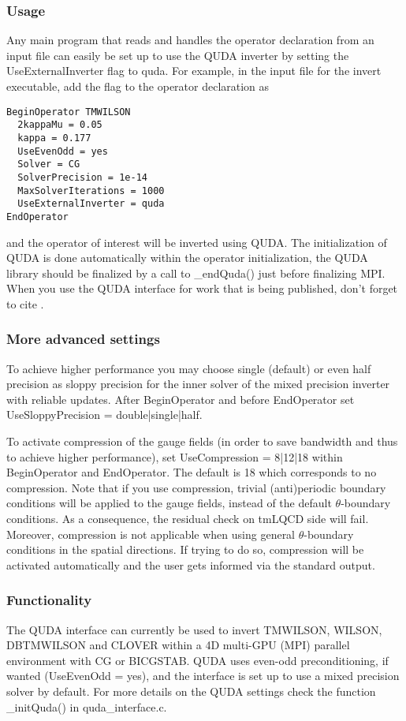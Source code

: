 \subsubsection{Usage}
Any main program that reads and handles the operator declaration from an input file can easily be set up to use the QUDA inverter by setting the {\ttfamily UseExternalInverter} flag to {\ttfamily quda}. For example, in the input file for the {\ttfamily invert} executable, add the flag to the operator declaration as
\begin{verbatim}
BeginOperator TMWILSON
  2kappaMu = 0.05
  kappa = 0.177
  UseEvenOdd = yes
  Solver = CG
  SolverPrecision = 1e-14
  MaxSolverIterations = 1000
  UseExternalInverter = quda
EndOperator
\end{verbatim}
and the operator of interest will be inverted using QUDA. The initialization of QUDA is done automatically within the operator initialization,  the QUDA library should be finalized by a call to {\ttfamily \_endQuda()} just before finalizing MPI. When you use the QUDA interface for work that is being published, don't forget to cite \cite{Clark:2009wm, Babich:2011np, Strelchenko:2013vaa}.


\subsubsection{More advanced settings}
To achieve higher performance you may choose single (default) or even half precision as sloppy precision for the inner solver of the mixed precision inverter with reliable updates. After {\ttfamily BeginOperator} and before {\ttfamily EndOperator} set {\ttfamily UseSloppyPrecision = double|single|half}.

To activate compression of the gauge fields (in order to save bandwidth and thus to achieve higher performance), set {\ttfamily UseCompression = 8|12|18} within {\ttfamily BeginOperator} and {\ttfamily EndOperator}. The default is 18 which corresponds to no compression. Note that if you use compression, trivial (anti)periodic boundary conditions will be applied to the gauge fields, instead of the default $\theta$-boundary conditions. As a consequence, the residual check on tmLQCD side will fail. Moreover, compression is not applicable when using general $\theta$-boundary conditions in the spatial directions. If trying to do so, compression will be activated automatically and the user gets informed via the standard output.


\subsubsection{Functionality}
The QUDA interface can currently be used to invert {\ttfamily TMWILSON, WILSON, DBTMWILSON} and {\ttfamily CLOVER} within a 4D multi-GPU (MPI) parallel environment with CG or BICGSTAB. QUDA uses even-odd preconditioning, if wanted ({\ttfamily UseEvenOdd = yes}), and the interface is set up to use a mixed precision solver by default. For more details on the QUDA settings check the function {\ttfamily \_initQuda()} in {\ttfamily quda\_interface.c}.







